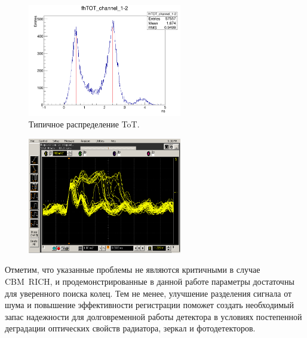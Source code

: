 \begin{figure}
\includegraphics[width=0.6\textwidth]{pictures/Scope_vs_data-data.png}
\caption{Типичное распределение ToT.}
\label{fig:ToTdata}
\end{figure}

\begin{figure}
\includegraphics[width=0.6\textwidth]{pictures/Scope2.png}
\caption{}
\label{fig:ToTscope2}
\end{figure}

Отметим, что указанные проблемы не являются критичными в случае CBM~RICH, и продемонстрированные в данной работе параметры достаточны для уверенного поиска колец. Тем не менее, улучшение разделения сигнала от шума и повышение эффективности регистрации поможет создать необходимый запас надежности для долговременной работы детектора в условиях постепенной деградации оптических свойств радиатора, зеркал и фотодетекторов.
